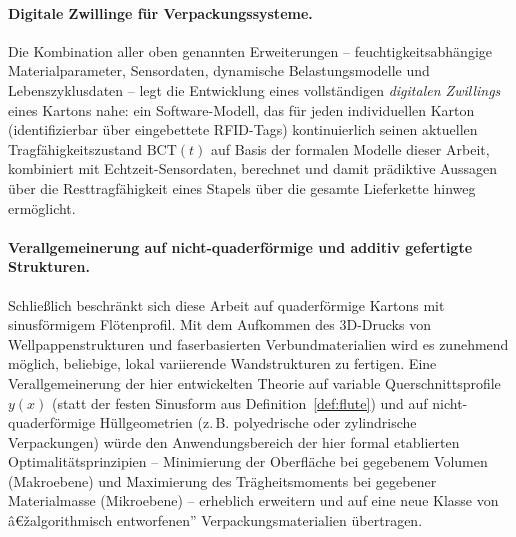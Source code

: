 ﻿\documentclass[a4paper,12pt]{article}
\theoremstyle{definition}
\begin{document}
\paragraph{Digitale Zwillinge für Verpackungssysteme.}
Die Kombination aller oben genannten Erweiterungen -- feuchtigkeitsabhängige
Materialparameter, Sensordaten, dynamische Belastungsmodelle und
Lebenszyklusdaten -- legt die Entwicklung eines vollständigen \emph{digitalen
Zwillings} eines Kartons nahe: ein Software-Modell, das für jeden individuellen
Karton (identifizierbar über eingebettete RFID-Tags) kontinuierlich seinen
aktuellen Tragfähigkeitszustand $\mathrm{BCT}(t)$ auf Basis der formalen Modelle
dieser Arbeit, kombiniert mit Echtzeit-Sensordaten, berechnet und damit
prädiktive Aussagen über die Resttragfähigkeit eines Stapels über die gesamte
Lieferkette hinweg ermöglicht.

\paragraph{Verallgemeinerung auf nicht-quaderförmige und additiv gefertigte Strukturen.}
Schließlich beschränkt sich diese Arbeit auf quaderförmige Kartons mit
sinusförmigem Flötenprofil. Mit dem Aufkommen des 3D-Drucks von
Wellpappenstrukturen und faserbasierten Verbundmaterialien wird es zunehmend
möglich, beliebige, lokal variierende Wandstrukturen zu fertigen. Eine
Verallgemeinerung der hier entwickelten Theorie auf variable Querschnittsprofile
$y(x)$ (statt der festen Sinusform aus Definition~\ref{def:flute}) und auf
nicht-quaderförmige Hüllgeometrien (z.\,B. polyedrische oder zylindrische
Verpackungen) würde den Anwendungsbereich der hier formal etablierten
Optimalitätsprinzipien -- Minimierung der Oberfläche bei gegebenem Volumen
(Makroebene) und Maximierung des Trägheitsmoments bei gegebener Materialmasse
(Mikroebene) -- erheblich erweitern und auf eine neue Klasse von
â€žalgorithmisch entworfenen'' Verpackungsmaterialien übertragen.
\end{document}
